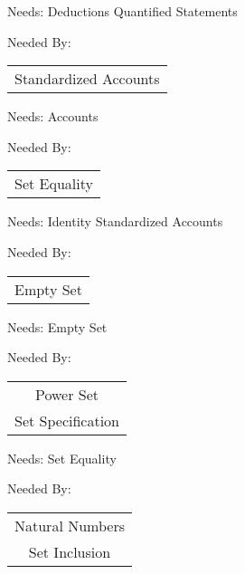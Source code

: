 \newpage
\label{accounts}


\clearpage
Needs:  Deductions  Quantified Statements 

Needed By: \begin{tabular}{c} Standardized Accounts \\ 
\end{tabular}
\clearpage{}

\newpage
\label{standardized_accounts}


\clearpage
Needs:  Accounts 

Needed By: \begin{tabular}{c} Set Equality \\ 
\end{tabular}
\clearpage{}

\newpage
\label{set_equality}


\clearpage
Needs:  Identity  Standardized Accounts 

Needed By: \begin{tabular}{c} Empty Set \\ 
\end{tabular}
\clearpage{}

\newpage
\label{set_inclusion}


\clearpage
Needs:  Empty Set 

Needed By: \begin{tabular}{c} Power Set \\  Set Specification \\ 
\end{tabular}
\clearpage{}

\newpage
\label{empty_set}


\clearpage
Needs:  Set Equality 

Needed By: \begin{tabular}{c} Natural Numbers \\  Set Inclusion \\ 
\end{tabular}
\clearpage{}

